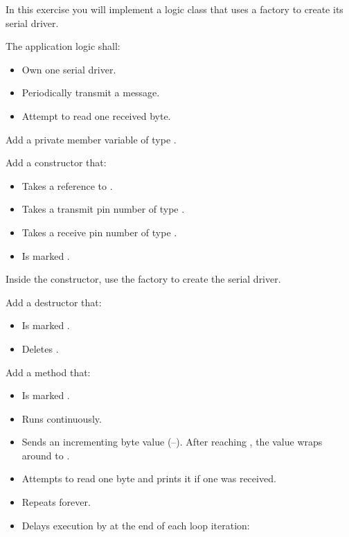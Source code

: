 \label{c4:set:3}

\label{c4:ex:3.1}
In this exercise you will implement a logic class  that uses a factory to
create its serial driver.

The application logic shall:
\begin{itemize}
  \item Own one serial driver.
  \item Periodically transmit a message.
  \item Attempt to read one received byte.
\end{itemize}

Add a private member variable  of type .

Add a constructor that:
\begin{itemize}
  \item Takes a reference to .
  \item Takes a transmit pin number of type .
  \item Takes a receive pin number of type .
  \item Is marked .
\end{itemize}
Inside the constructor, use the factory to create the serial driver.

Add a destructor that:
\begin{itemize}
  \item Is marked .
  \item Deletes .
\end{itemize}

Add a method  that:
\begin{itemize}
  \item Is marked .
  \item Runs continuously.
  \item Sends an incrementing byte value (--). After reaching , the value
    wraps around to .
  \item Attempts to read one byte and prints it if one was received.
  \item Repeats forever.
  \item Delays execution by  at the end of each loop iteration:
\end{itemize}

